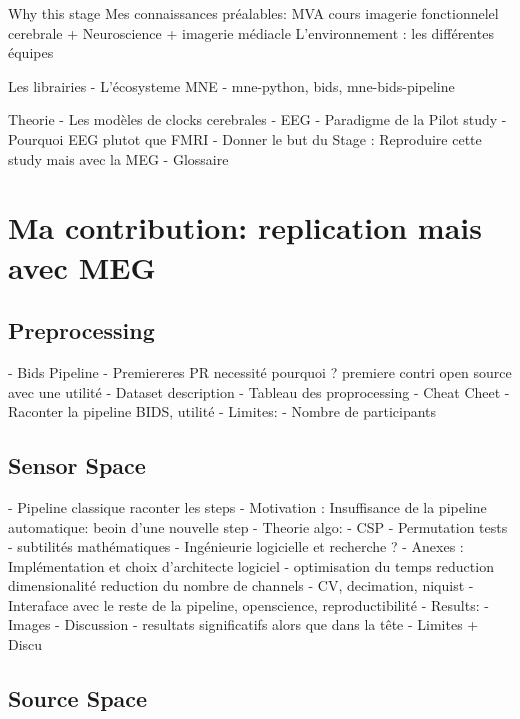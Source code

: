 Why this stage
Mes connaissances préalables: MVA cours imagerie fonctionnelel cerebrale + Neuroscience + imagerie médiacle
L'environnement : les différentes équipes


Les librairies
- L'écosysteme MNE
    - mne-python, bids, mne-bids-pipeline

Theorie
- Les modèles de clocks cerebrales
- EEG
- Paradigme de la Pilot study
- Pourquoi EEG plutot que FMRI
- Donner le but du Stage : 
    Reproduire cette study mais avec la MEG
- Glossaire

\chapter{Ma contribution: replication mais avec MEG}



\section{Preprocessing}

- Bids Pipeline
- Premiereres PR necessité pourquoi ?
    premiere contri open source
    avec une utilité
- Dataset description
- Tableau des proprocessing
- Cheat Cheet
- Raconter la pipeline BIDS, utilité
- Limites:
    - Nombre de participants

\section{Sensor Space}

- Pipeline classique raconter les steps
- Motivation : Insuffisance de la pipeline automatique: beoin d'une nouvelle step
- Theorie algo:
    - CSP
    - Permutation tests
    - subtilités mathématiques
    - Ingénieurie logicielle et recherche ?
- Anexes : Implémentation et choix d'architecte logiciel
    - optimisation du temps
        reduction dimensionalité
        reduction du nombre de channels
    - CV, decimation, niquist
    - Interaface avec le reste de la pipeline, openscience, reproductibilité
- Results:
    - Images
- Discussion
    - resultats significatifs alors que dans la tête
- Limites + Discu

\section{Source Space}

